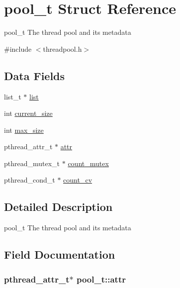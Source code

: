 \hypertarget{structpool}{}\section{pool\+\_\+t Struct Reference}
\label{structpool}


pool\+\_\+t The thread pool and its metadata  




{\ttfamily \#include $<$threadpool.\+h$>$}

\subsection*{Data Fields}
\begin{DoxyCompactItemize}
\item 
list\+\_\+t $\ast$ \hyperlink{structpool_a95cbd0e4b46a4ae78a62db9f7f4ef3a9}{list}
\item 
int \hyperlink{structpool_a9f7a2e94e1205655dfc8c6bf60862501}{current\+\_\+size}
\item 
int \hyperlink{structpool_aefc86e749ecf9ab0aea5459173180e3a}{max\+\_\+size}
\item 
pthread\+\_\+attr\+\_\+t $\ast$ \hyperlink{structpool_af0360ef4ad9c5c1826b0ecec0cc82ea5}{attr}
\item 
pthread\+\_\+mutex\+\_\+t $\ast$ \hyperlink{structpool_ae5d29237dc5f83accc03d65f825b127f}{count\+\_\+mutex}
\item 
pthread\+\_\+cond\+\_\+t $\ast$ \hyperlink{structpool_aa0f704f15aebe84d4264ef85c8074fc9}{count\+\_\+cv}
\end{DoxyCompactItemize}


\subsection{Detailed Description}
pool\+\_\+t The thread pool and its metadata 

\subsection{Field Documentation}
\hypertarget{structpool_af0360ef4ad9c5c1826b0ecec0cc82ea5}{}
\subsubsection[{attr}]{\setlength{\rightskip}{0pt plus 5cm}pthread\+\_\+attr\+\_\+t$\ast$ pool\+\_\+t\+::attr}\label{structpool_af0360ef4ad9c5c1826b0ecec0cc82ea5}
\hypertarget{structpool_aa0f704f15aebe84d4264ef85c8074fc9}{}
